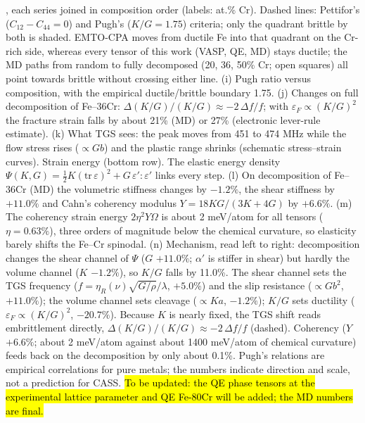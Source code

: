 \documentclass[final,3p,times]{elsarticle}
\DeclareRobustCommand{\upd}[1]{{\sethlcolor{yellow}\hl{To be updated: #1}}} %
\providecommand{\DIFaddend}{} %
\begin{document}
{, each series joined in composition order (labels: at.\% Cr). Dashed lines: Pettifor's ($C_{12}-C_{44}=0$) and Pugh's ($K/G=1.75$) criteria; only the quadrant brittle by both is shaded. EMTO-CPA moves from ductile Fe into that quadrant on the Cr-rich side, whereas every tensor of this work (VASP, QE, MD) stays ductile; the MD paths from random to fully decomposed (20, 36, 50\% Cr; open squares) all point towards brittle without crossing either line. (i) Pugh ratio versus composition, with the empirical ductile/brittle boundary 1.75. (j) Changes on full decomposition of Fe--36Cr: $\Delta(K/G)/(K/G)\approx-2\,\Delta f/f$; with $\varepsilon_F\propto(K/G)^2$ the fracture strain falls by about 21\% (MD) or 27\% (electronic lever-rule estimate). (k) What TGS sees: the peak moves from 451 to 474 MHz while the flow stress rises ($\propto Gb$) and the plastic range shrinks (schematic stress--strain curves). Strain energy (bottom row). The elastic energy density $\Psi(K,G)=\frac{1}{2}K(\mathrm{tr}\,\varepsilon)^2+G\,\varepsilon':\varepsilon'$ links every step. (l) On decomposition of Fe--36Cr (MD) the volumetric stiffness changes by $-1.2\%$, the shear stiffness by $+11.0\%$ and Cahn's coherency modulus $Y=18KG/(3K+4G)$ by $+6.6\%$. (m) The coherency strain energy $2\eta^2Y\Omega$ is about 2 meV/atom for all tensors ($\eta=0.63\%$), three orders of magnitude below the chemical curvature, so elasticity barely shifts the Fe--Cr spinodal. (n) Mechanism, read left to right: decomposition changes the shear channel of $\Psi$ ($G$ $+11.0\%$; $\alpha'$ is stiffer in shear) but hardly the volume channel ($K$ $-1.2\%$), so $K/G$ falls by 11.0\%. The shear channel sets the TGS frequency ($f=\eta_R(\nu)\sqrt{G/\rho}/\lambda$, $+5.0\%$) and the slip resistance ($\propto Gb^2$, $+11.0\%$); the volume channel sets cleavage ($\propto Ka$, $-1.2\%$); $K/G$ sets ductility ($\varepsilon_F\propto(K/G)^2$, $-20.7\%$). Because $K$ is nearly fixed, the TGS shift reads embrittlement directly, $\Delta(K/G)/(K/G)\approx-2\,\Delta f/f$ (dashed). Coherency ($Y$ $+6.6\%$; about 2 meV/atom against about 1400 meV/atom of chemical curvature) feeds back on the decomposition by only about 0.1\%. Pugh's relations are empirical correlations for pure metals; the numbers indicate direction and scale, not a prediction for CASS. }\upd{the QE phase tensors at the experimental lattice parameter and QE Fe-80Cr will be added; the MD numbers are final.}
\clearpage
\DIFaddend 
\end{document}
